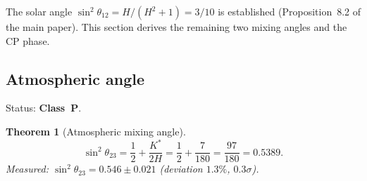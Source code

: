 \documentclass[11pt,a4paper]{article}
\newtheorem{theorem}{Theorem}[section]
\theoremstyle{definition}
\theoremstyle{remark}
\begin{document}
The solar angle $\sin^2\theta_{12} = H/(H^2+1) = 3/10$ is established (Proposition~8.2 of the main paper). This section derives the remaining two mixing angles and the CP phase.


\subsection{Atmospheric angle}\label{sec:atm}

Status: \textbf{Class~P}.

\begin{theorem}[Atmospheric mixing angle]\label{thm:theta23}
\begin{equation}\label{eq:theta23}
\sin^2\theta_{23} = \frac{1}{2} + \frac{K^*}{2H} = \frac{1}{2} + \frac{7}{180} = \frac{97}{180} = 0.5389.
\end{equation}
Measured: $\sin^2\theta_{23} = 0.546 \pm 0.021$ (deviation $1.3\%$, $0.3\sigma$).
\end{theorem}
\end{document}
